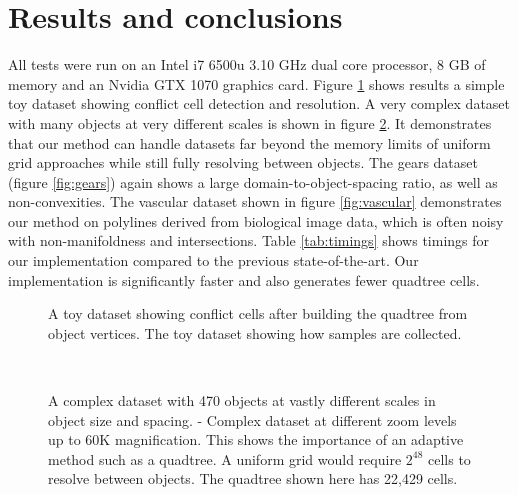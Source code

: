 \documentclass[final,3p,times,twocolumn]{elsarticle}
\begin{document}
\section{Results and conclusions}
All tests were run on
 an Intel i7 6500u 3.10 GHz dual core processor, 8 GB of memory and an Nvidia GTX 1070 graphics card. Figure \ref{fig:results-toy} shows results a simple toy dataset showing conflict cell detection and resolution. A very complex dataset with many objects at very different scales is shown in figure \ref{fig:results-maze}. It demonstrates that our method can handle datasets far beyond the memory limits of uniform grid approaches while still fully resolving between objects. The gears dataset (figure \ref{fig:gears}) again shows a large domain-to-object-spacing ratio, as well as non-convexities. The vascular dataset shown in figure \ref{fig:vascular} demonstrates our method on polylines derived from biological image data, which is often noisy with non-manifoldness and intersections. Table \ref{tab:timings} shows timings for our implementation compared to the previous state-of-the-art. Our implementation is significantly faster and also generates fewer quadtree cells. 

\begin{figure}
  \centering

  \caption{
    \protect{} A toy dataset showing conflict cells after building the quadtree from object vertices.
    \protect{} The toy dataset showing how samples are collected.
  }
  \label{fig:results-toy}
\end{figure}

\begin{figure}
  \centering
   \\
  \caption{
    \protect{} A complex dataset with 470 objects at vastly different scales in object size and spacing.
    \protect{}-\protect{} Complex dataset at different zoom levels up to 60K magnification. This shows the importance of an adaptive method such as a quadtree. A uniform grid would require $2^{48}$ cells to resolve between objects. The quadtree shown here has 22,429 cells.
  }
  \label{fig:results-maze}
\end{figure}
\end{document}
